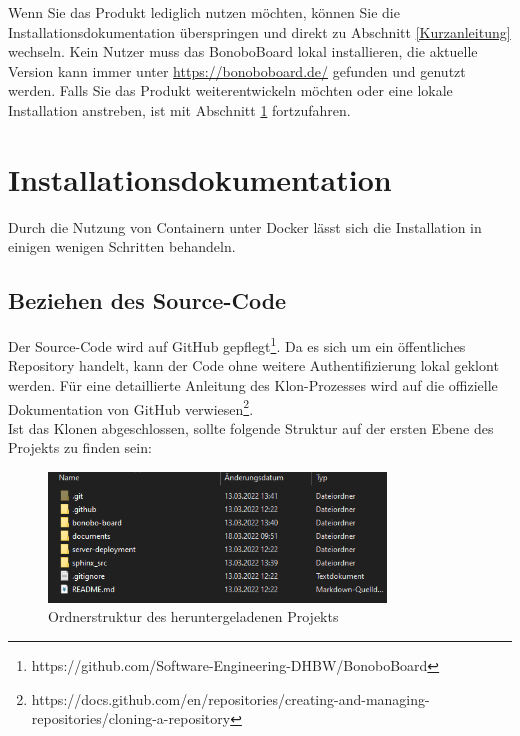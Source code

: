 \documentclass[a4paper,11pt]{scrartcl}
\begin{document}
\noindent Wenn Sie das Produkt lediglich nutzen möchten, können Sie die Installationsdokumentation überspringen und direkt zu Abschnitt \ref{Kurzanleitung} wechseln. Kein Nutzer muss das BonoboBoard lokal installieren, die aktuelle Version kann immer unter \url{https://bonoboboard.de/} gefunden und genutzt werden. Falls Sie das Produkt weiterentwickeln möchten oder eine lokale Installation anstreben, ist mit Abschnitt \ref{Installationsdokumentation} fortzufahren. 

\section{Installationsdokumentation}\label{Installationsdokumentation}
Durch die Nutzung von Containern unter Docker lässt sich die Installation in einigen wenigen Schritten behandeln.
\subsection{Beziehen des Source-Code}
Der Source-Code wird auf GitHub gepflegt\footnote{https://github.com/Software-Engineering-DHBW/BonoboBoard}. Da es sich um ein öffentliches Repository handelt, kann der Code ohne weitere Authentifizierung lokal geklont werden. Für eine detaillierte Anleitung des Klon-Prozesses wird auf die offizielle Dokumentation von GitHub verwiesen\footnote{https://docs.github.com/en/repositories/creating-and-managing-repositories/cloning-a-repository}.\\
Ist das Klonen abgeschlossen, sollte folgende Struktur auf der ersten Ebene des Projekts zu finden sein:
\begin{figure}[H]
\begin{center}
\includegraphics[width=0.8\textwidth]{folder_repo_1}
\caption{Ordnerstruktur des heruntergeladenen Projekts}
\label{img:folder_1}
\end{center}
\end{figure}
\end{document}
